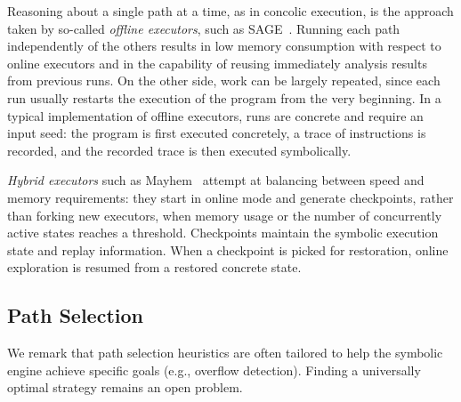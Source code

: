 Reasoning about a single path at a time, as in concolic execution, is the approach taken by so-called {\em offline executors}, such as {\sc SAGE}~\cite{SAGE-NDSS08}. Running each path independently of the others results in low memory consumption with respect to online executors and in the capability of reusing immediately analysis results from previous runs. On the other side, work can be largely repeated, since each run usually restarts the execution of the program from the very beginning. In a typical implementation of offline executors, runs are concrete and require an input seed: the program is first executed concretely, a trace of instructions is recorded, and the recorded trace is then executed symbolically.

{\em Hybrid executors} such as {\sc Mayhem}~\cite{MAYHEM-SP12} attempt at balancing between speed and memory requirements: they start in online mode and generate checkpoints, rather than forking new executors, when memory usage or the number of concurrently active states reaches a threshold. Checkpoints maintain the symbolic execution state and replay information. When a checkpoint is picked for restoration, online exploration is resumed from a restored concrete state.

\vspace{-1mm}
\subsection{Path Selection}
\label{ss:heuristics}

%
We remark that path selection heuristics are often tailored to help the symbolic engine achieve specific goals (e.g., overflow detection). Finding a universally   optimal strategy remains an open problem. %

